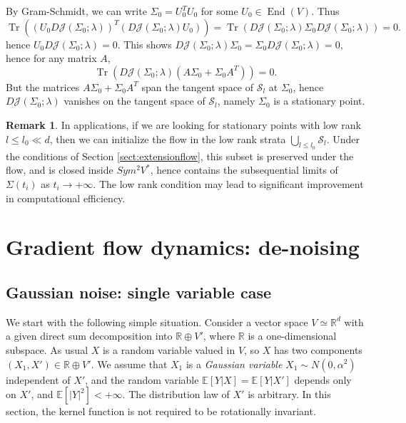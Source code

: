 \documentclass[a4paper]{article}
\theoremstyle{definition}
\newtheorem{rmk}{Remark}
\newcommand{\R}{\mathbb{R}}
\newcommand{\E}{\mathbb{E}}
\newcommand{\1}{\mathbbm{1}}
\DeclareMathOperator{\End}{End}
\DeclareMathOperator{\Tr}{Tr}
\begin{document}
	
	
	By Gram-Schmidt, we can write $\Sigma_0=U_0^TU_0$ for some $U_0\in \End(V)$. Thus
	\[
	\Tr (    (U_0 D\mathcal{J}(\Sigma_0;\lambda))^T (D\mathcal{J} (\Sigma_0;\lambda)U_0)       ) = \Tr( D\mathcal{J}(\Sigma_0;\lambda) \Sigma_0 D\mathcal{J} (\Sigma_0;\lambda)     )=0.
	\]
	hence $U_0 D\mathcal{J}(\Sigma_0;\lambda)=0$. This shows $D\mathcal{J} (\Sigma_0;\lambda) \Sigma_0=\Sigma_0 D\mathcal{J}(\Sigma_0;\lambda)=0$, hence for any matrix $A$, 
	\[
	\Tr(D\mathcal{J} (\Sigma_0;\lambda) (A \Sigma_0+ \Sigma_0 A^T)     ) =0.
	\]
	But the matrices $A \Sigma_0+ \Sigma_0 A^T$ span the tangent space of $\mathcal{S}_l$ at $\Sigma_0$, hence $D\mathcal{J}(\Sigma_0;\lambda)$ vanishes on the tangent space of 
	$\mathcal{S}_l$, namely $\Sigma_0$ is a stationary point.
	
	
	
	
	
	
	
	
	\begin{rmk}
		In applications, if we are looking for stationary points with low rank $l\leq l_0\ll d$, then we can initialize the flow in the low rank strata $\bigcup_{l\leq l_0} \mathcal{S}_l$.
		Under the conditions of Section \ref{sect:extensionflow}, 
		this subset is preserved under the flow, and is closed inside $Sym^2 V^*$, hence contains the subsequential limits of $\Sigma(t_i)$ as $t_i\to +\infty$. The low rank condition may lead to significant improvement in computational efficiency.
	\end{rmk}
	
	
	
	\section{Gradient flow dynamics: de-noising}
	
	
	
	
	
	
	
	
	
	
	
	\subsection{Gaussian noise: single variable case}\label{sect:Gaussiansingle}
	
	
	
	
	We start with the following simple situation. Consider a vector space $V\simeq \R^d$ with a given direct sum decomposition into $\R\oplus V'$, where $\R$ is a one-dimensional subspace. As usual $X$ is a random variable valued in $V$, so $X$ has two components $(X_1, X')\in \R\oplus V'$. We assume that $X_1$ is a \emph{Gaussian variable} $X_1\sim N(0, \alpha^2) $  independent of $X'$, and the random variable $\E[Y|X]=\E[Y|X']$ depends only on $X'$, and $\E[|Y|^2]<+\infty$. The distribution law of $X'$ is arbitrary. %
	In this section, the kernel function is not required to be rotationally invariant.
	
\end{document}
